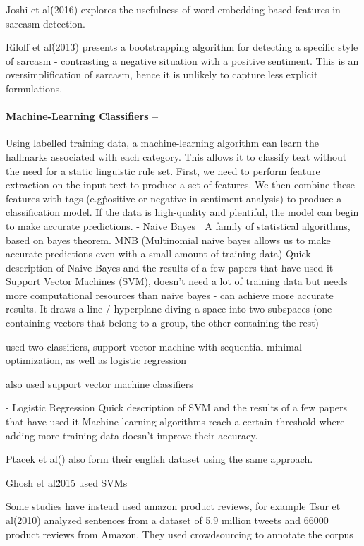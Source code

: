 \documentclass[12pt,a4paper]{article}
\begin{document}
Joshi et al\. (2016) explores the usefulness of word-embedding based features in sarcasm detection. 

Riloff et al\. (2013) presents a bootstrapping algorithm for detecting a specific style of sarcasm - contrasting a negative situation with a positive sentiment. This is an oversimplification of sarcasm, hence it is unlikely to capture less explicit formulations.



\paragraph{Machine-Learning Classifiers --}
Using labelled training data, a machine-learning algorithm can learn the hallmarks associated with each category. This allows it to classify text without the need for a static linguistic rule set. First, we need to perform feature extraction on the input text to produce a set of features. We then combine these features with tags (e.g\. positive or negative in sentiment analysis) to produce a classification model. If the data is high-quality and plentiful, the model can begin to make accurate predictions.
- Naive Bayes | A family of statistical algorithms, based on bayes theorem. MNB (Multinomial naive bayes allows us to make accurate predictions even with a small amount of training data)
Quick description of Naive Bayes and the results of a few papers that have used it
- Support Vector Machines (SVM), doesn't need a lot of training data but needs more computational resources than naive bayes - can achieve more accurate results. It draws a line / hyperplane diving a space into two subspaces (one containing vectors that belong to a group, the other containing the rest)

\cite{gonzalez2011identifying} used two classifiers, support vector machine with sequential minimal optimization, as well as logistic regression

\cite{ptavcek2014sarcasm} also used support vector machine classifiers
 
- Logistic Regression
Quick description of SVM and the results of a few papers that have used it
Machine learning algorithms reach a certain threshold where adding more training data doesn't improve their accuracy.


Ptacek et al\. () also form their english dataset using the same approach.

Ghosh et al\. 2015 used SVMs


Some studies have instead used amazon product reviews, for example Tsur et al\. (2010) analyzed sentences from a dataset of 5.9 million tweets and 66000 product reviews from Amazon. They used crowdsourcing to annotate the corpus
\end{document}
